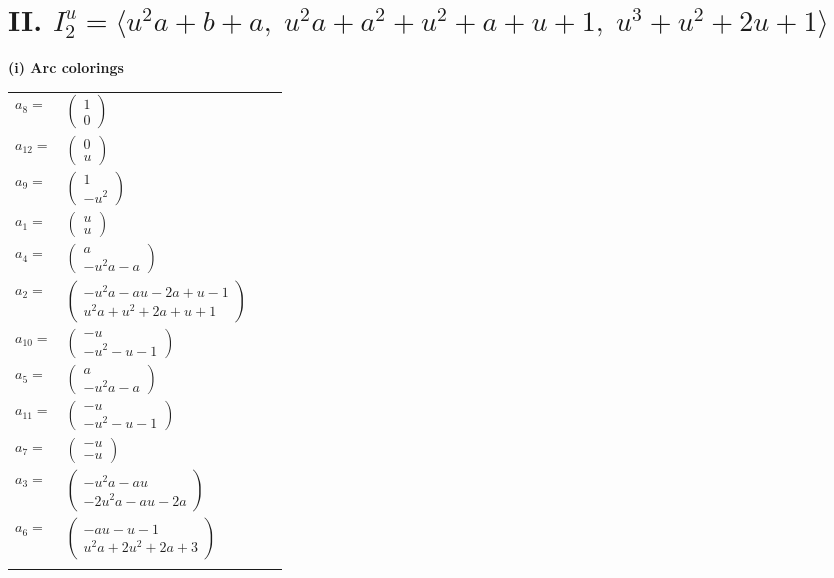 \documentclass[1p]{elsarticle_modified}
\theoremstyle{definition}
\begin{document}
\centering \section*{II. $I^u_{2}= \langle u^2 a+b+a,\;u^2 a+a^2+u^2+a+u+1,\;u^3+u^2+2 u+1 \rangle$}
\flushleft \textbf{(i) Arc colorings}\\
\begin{tabular}{m{7pt} m{180pt} m{7pt} m{180pt} }
\flushright $a_{8}=$&$\begin{pmatrix}1\\0\end{pmatrix}$ \\
\flushright $a_{12}=$&$\begin{pmatrix}0\\u\end{pmatrix}$ \\
\flushright $a_{9}=$&$\begin{pmatrix}1\\- u^2\end{pmatrix}$ \\
\flushright $a_{1}=$&$\begin{pmatrix}u\\u\end{pmatrix}$ \\
\flushright $a_{4}=$&$\begin{pmatrix}a\\- u^2 a- a\end{pmatrix}$ \\
\flushright $a_{2}=$&$\begin{pmatrix}- u^2 a- a u-2 a+u-1\\u^2 a+u^2+2 a+u+1\end{pmatrix}$ \\
\flushright $a_{10}=$&$\begin{pmatrix}- u\\- u^2- u-1\end{pmatrix}$ \\
\flushright $a_{5}=$&$\begin{pmatrix}a\\- u^2 a- a\end{pmatrix}$ \\
\flushright $a_{11}=$&$\begin{pmatrix}- u\\- u^2- u-1\end{pmatrix}$ \\
\flushright $a_{7}=$&$\begin{pmatrix}- u\\- u\end{pmatrix}$ \\
\flushright $a_{3}=$&$\begin{pmatrix}- u^2 a- a u\\-2 u^2 a- a u-2 a\end{pmatrix}$ \\
\flushright $a_{6}=$&$\begin{pmatrix}- a u- u-1\\u^2 a+2 u^2+2 a+3\end{pmatrix}$\\&\end{tabular}
\end{document}
